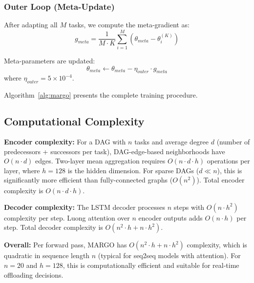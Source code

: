 \documentclass[journal,twoside]{IEEEtran}
\newcommand{\method}{\textsc{MARGO}}
\begin{document}
\subsubsection{Outer Loop (Meta-Update)}

After adapting all $M$ tasks, we compute the meta-gradient as:
\begin{equation}
g_{meta} = \frac{1}{M \cdot K} \sum_{i=1}^{M} (\theta_{meta} - \theta_i^{(K)})
\label{eq:reptile_gradient}
\end{equation}

Meta-parameters are updated:
\begin{equation}
\theta_{meta} \leftarrow \theta_{meta} - \eta_{outer} \cdot g_{meta}
\label{eq:reptile_meta}
\end{equation}
where $\eta_{outer} = 5 \times 10^{-4}$.

Algorithm~\ref{alg:margo} presents the complete training procedure.

\subsection{Computational Complexity}

\textbf{Encoder complexity:} For a DAG with $n$ tasks and average degree $d$ (number of predecessors + successors per task), DAG-edge-based neighborhoods have $O(n \cdot d)$ edges. Two-layer mean aggregation requires $O(n \cdot d \cdot h)$ operations per layer, where $h=128$ is the hidden dimension. For sparse DAGs ($d \ll n$), this is significantly more efficient than fully-connected graphs ($O(n^2)$). Total encoder complexity is $O(n \cdot d \cdot h)$.

\textbf{Decoder complexity:} The LSTM decoder processes $n$ steps with $O(n \cdot h^2)$ complexity per step. Luong attention over $n$ encoder outputs adds $O(n \cdot h)$ per step. Total decoder complexity is $O(n^2 \cdot h + n \cdot h^2)$.

\textbf{Overall:} Per forward pass, \method{} has $O(n^2 \cdot h + n \cdot h^2)$ complexity, which is quadratic in sequence length $n$ (typical for seq2seq models with attention). For $n=20$ and $h=128$, this is computationally efficient and suitable for real-time offloading decisions.
\end{document}
